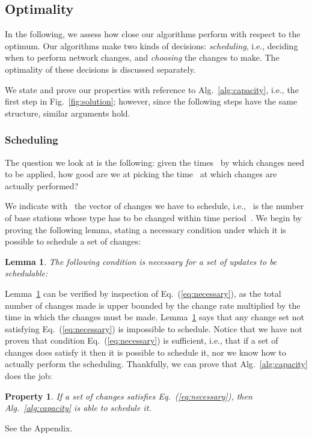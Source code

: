 \documentclass[10pt,journal,cspaper,compsoc]{IEEEtran}
\newcommand{\Fig}[1]{Fig.~\ref{fig:#1}}
\newcommand{\Eq}[1]{Eq.~(\ref{eq:#1})}
\newcommand{\Alg}[1]{Alg.~\ref{alg:#1}}
\newcommand{\Lemma}[1]{Lemma~\ref{lem:#1}}
\newtheorem{property}{Property}
\newtheorem{lemma}{Lemma}
\begin{document}
\subsection{Optimality}

In the following, we assess how close our algorithms perform with respect to the optimum. 
Our algorithms make two kinds of decisions: {\em scheduling}, i.e., deciding when to perform network changes, and
{\em choosing} the changes to make. The optimality of these decisions is discussed separately.

We state and prove our properties with reference to \Alg{capacity},
i.e., the first step in \Fig{solution}; however, since the following steps have the same structure, similar arguments hold.

\subsubsection{Scheduling}

The question we look at is the following: given the times~ by which changes need to be applied,
how good are we at picking the time~ at which changes are actually performed?

We indicate with~ the vector of changes we have to schedule, i.e.,~ is the number of
base stations whose type has to be changed within time period~.
We begin by proving the following lemma, stating a necessary condition
under which it is possible to schedule a set of changes:
\begin{lemma}
\label{lem:necessary}
The following condition is necessary for a set of updates to be schedulable:

\end{lemma}
\Lemma{necessary} can be verified by inspection of \Eq{necessary}, as the total number of changes made
is upper bounded by the change rate multiplied by the time in which the changes must be made.
\Lemma{necessary} says that any change set not satisfying \Eq{necessary} is impossible to schedule.
Notice that we have not proven that condition \Eq{necessary} is sufficient, i.e., that
if a set of changes does satisfy it then it is possible to schedule it, nor we know how to actually perform the scheduling.
Thankfully, we can prove that \Alg{capacity} does the job:
\begin{property}
\label{prop:feasible}
If a set of changes satisfies \Eq{necessary}, then \Alg{capacity} is able to schedule it.
\end{property}
\begin{IEEEproof}
See the Appendix.
\end{IEEEproof}
\end{document}
